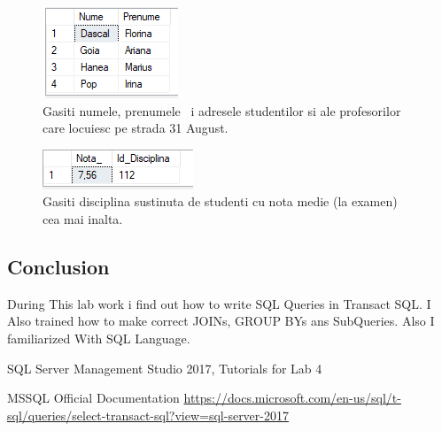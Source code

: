 \documentclass[12pt]{article}
\begin{document}
        \begin{figure}[H]
                \centering
                \includegraphics[width=.32\textwidth]{img26.png}
                \caption{Gasiti numele, prenumele ~i adresele studentilor si ale profesorilor care locuiesc pe strada 31 August.  }
        \end{figure}
        \vspace{0.5 cm}

        \begin{figure}[H]
                \centering
                \includegraphics[width=.3\textwidth]{img37.png}
                \caption{Gasiti disciplina sustinuta de studenti cu nota medie (la examen) cea mai inalta.}
        \end{figure}
        \vspace{0.5 cm}

        \newpage 
        \subsection*{Conclusion}
        During This lab work i find out how to write SQL Queries in Transact SQL. I Also trained how to make correct JOINs, GROUP BYs ans SubQueries. Also I familiarized With SQL Language.
        \cite{SQLServerManagementStudio}
        

 
\medskip
 
\begin{thebibliography}{9}
SQL Server Management Studio 2017, Tutorials for Lab 4

MSSQL Official Documentation
\url{https://docs.microsoft.com/en-us/sql/t-sql/queries/select-transact-sql?view=sql-server-2017}
\end{thebibliography}
                
\end{document}
